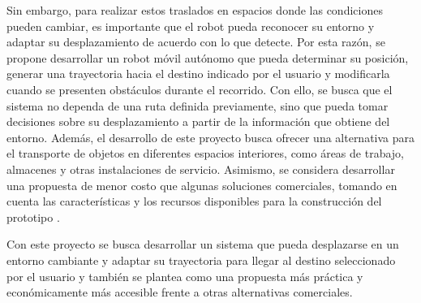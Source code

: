 Sin embargo, para realizar estos traslados en espacios donde las condiciones pueden cambiar, es importante que el robot pueda reconocer su entorno y adaptar su desplazamiento de acuerdo con lo que detecte. Por esta razón, se propone desarrollar un robot móvil autónomo que pueda determinar su posición, generar una trayectoria hacia el destino indicado por el usuario y modificarla cuando se presenten obstáculos durante el recorrido. Con ello, se busca que el sistema no dependa de una ruta definida previamente, sino que pueda tomar decisiones sobre su desplazamiento a partir de la información que obtiene del entorno.
Además, el desarrollo de este proyecto busca ofrecer una alternativa para el transporte de objetos en diferentes espacios interiores, como áreas de trabajo, almacenes y otras instalaciones de servicio. Asimismo, se considera desarrollar una propuesta de menor costo que algunas soluciones comerciales, tomando en cuenta las características y los recursos disponibles para la construcción del prototipo \cite{EDA1}.

Con este proyecto se busca desarrollar un sistema que pueda desplazarse en un entorno cambiante y adaptar su trayectoria para llegar al destino seleccionado por el usuario y también se plantea como una propuesta más práctica y económicamente más accesible frente a otras alternativas comerciales.